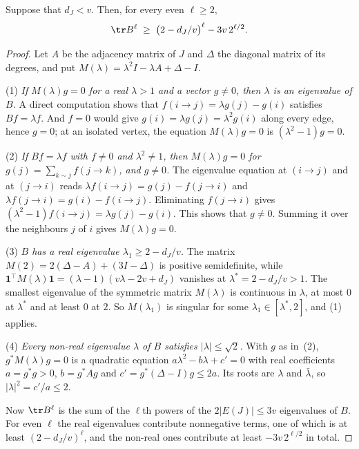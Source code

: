 \begin{lemma}\label{lem:spectrum}
Suppose that $d_J<v$. Then, for every even $\ell\ge2$,
\[
  \tr B^{\ell}\;\ge\;\bigl(2-d_J/v\bigr)^{\ell}-3v\,2^{\ell/2}.
\]
\end{lemma}

\begin{proof}
Let $A$ be the adjacency matrix of $J$ and $\Delta$ the diagonal matrix of its degrees, and put
$M(\lambda)=\lambda^{2}I-\lambda A+\Delta-I$.

(1) \emph{If $M(\lambda)g=0$ for a real $\lambda>1$ and a vector $g\ne0$, then $\lambda$ is an
eigenvalue of $B$.} A direct computation shows that $f(i\to j)=\lambda g(j)-g(i)$ satisfies
$Bf=\lambda f$. And $f=0$ would give $g(i)=\lambda g(j)=\lambda^{2}g(i)$ along every edge, hence
$g=0$; at an isolated vertex, the equation $M(\lambda)g=0$ is $(\lambda^{2}-1)g=0$.

(2) \emph{If $Bf=\lambda f$ with $f\ne0$ and $\lambda^{2}\ne1$, then $M(\lambda)g=0$ for
$g(j)=\sum_{k\sim j}f(j\to k)$, and $g\ne0$.} The eigenvalue equation at $(i\to j)$ and at
$(j\to i)$ reads $\lambda f(i\to j)=g(j)-f(j\to i)$ and $\lambda f(j\to i)=g(i)-f(i\to j)$.
Eliminating $f(j\to i)$ gives $(\lambda^{2}-1)f(i\to j)=\lambda g(j)-g(i)$. This shows that
$g\ne0$. Summing it over the neighbours $j$ of $i$ gives $M(\lambda)g=0$.

(3) \emph{$B$ has a real eigenvalue $\lambda_1\ge2-d_J/v$.} The matrix
$M(2)=2(\Delta-A)+(3I-\Delta)$ is positive semidefinite, while
$\mathbf{1}^{\!\top}M(\lambda)\mathbf{1}=(\lambda-1)(v\lambda-2v+d_J)$ vanishes at
$\lambda^{*}=2-d_J/v>1$. The smallest eigenvalue of the symmetric matrix $M(\lambda)$ is continuous
in $\lambda$, at most $0$ at $\lambda^{*}$ and at least $0$ at $2$. So $M(\lambda_1)$ is singular for
some $\lambda_1\in[\lambda^{*},2]$, and (1) applies.

(4) \emph{Every non-real eigenvalue $\lambda$ of $B$ satisfies $|\lambda|\le\sqrt2$.} With $g$ as
in~(2), $g^{*}M(\lambda)g=0$ is a quadratic equation $a\lambda^{2}-b\lambda+c'=0$ with real
coefficients $a=g^{*}g>0$, $b=g^{*}Ag$ and $c'=g^{*}(\Delta-I)g\le2a$. Its roots are $\lambda$ and
$\bar\lambda$, so $|\lambda|^{2}=c'/a\le2$.

Now $\tr B^{\ell}$ is the sum of the $\ell$th powers of the $2|E(J)|\le3v$ eigenvalues of $B$. For
even $\ell$ the real eigenvalues contribute nonnegative terms, one of which is at least
$(2-d_J/v)^{\ell}$, and the non-real ones contribute at least $-3v\,2^{\ell/2}$ in total.
\end{proof}

